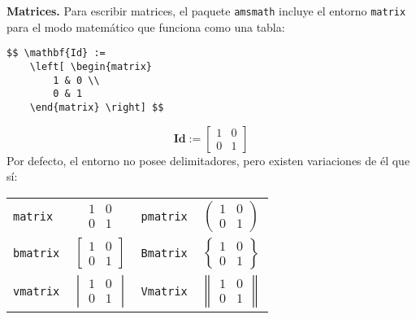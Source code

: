 \documentclass[intro-breve-latex.tex]{subfiles}
\begin{document}
\textbf{Matrices.} Para escribir matrices, el paquete \texttt{amsmath} incluye el entorno \texttt{matrix} para el modo matemático que funciona como una tabla:
\begin{lstlisting}
$$ \mathbf{Id} :=
	\left[ \begin{matrix}
		1 & 0 \\
		0 & 1
	\end{matrix} \right] $$
\end{lstlisting}
$$ \mathbf{Id} :=
	\left[ \begin{matrix}
		1 & 0 \\
		0 & 1
	\end{matrix} \right] $$
Por defecto, el entorno no posee delimitadores, pero existen variaciones de él que sí:
\begin{center}
	\begin{tabular}{lc|lc}
		\hline \hline
		\texttt{matrix}  & {$\begin{matrix}  1 & 0 \\ 0 & 1 \end{matrix}$}  & \texttt{pmatrix} & {$\begin{pmatrix} 1 & 0 \\ 0 & 1 \end{pmatrix}$} \\[1.2em]
		\texttt{bmatrix} & {$\begin{bmatrix} 1 & 0 \\ 0 & 1 \end{bmatrix}$} & \texttt{Bmatrix} & {$\begin{Bmatrix} 1 & 0 \\ 0 & 1 \end{Bmatrix}$} \\[1.2em]
		\texttt{vmatrix} & {$\begin{vmatrix} 1 & 0 \\ 0 & 1 \end{vmatrix}$} & \texttt{Vmatrix} & {$\begin{Vmatrix} 1 & 0 \\ 0 & 1 \end{Vmatrix}$} \\
		\hline \hline
	\end{tabular}
\end{center}
\end{document}
